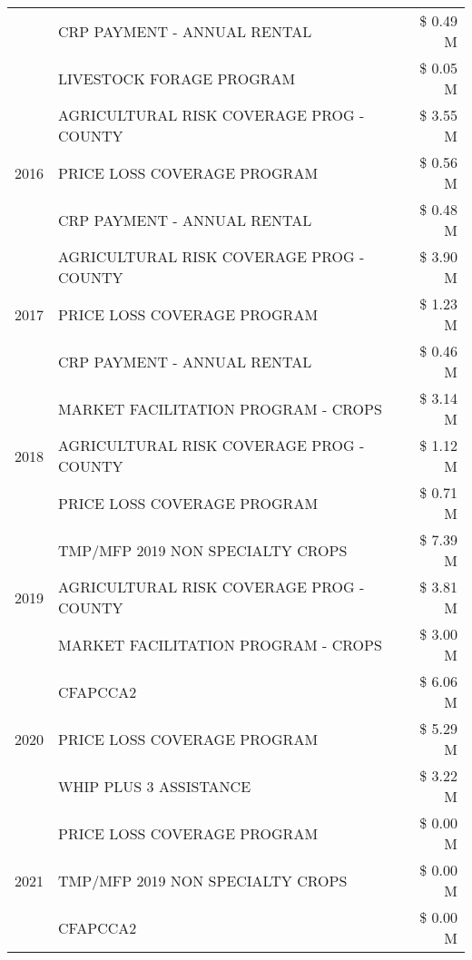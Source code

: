 \begin{tabular}{llr}
 & CRP PAYMENT - ANNUAL RENTAL & \$ 0.49 M \\
 & LIVESTOCK FORAGE PROGRAM & \$ 0.05 M \\
\cline{1-3}
\multirow[t]{3}{*}{2016} & AGRICULTURAL RISK COVERAGE PROG - COUNTY & \$ 3.55 M \\
 & PRICE LOSS COVERAGE PROGRAM & \$ 0.56 M \\
 & CRP PAYMENT - ANNUAL RENTAL & \$ 0.48 M \\
\cline{1-3}
\multirow[t]{3}{*}{2017} & AGRICULTURAL RISK COVERAGE PROG - COUNTY & \$ 3.90 M \\
 & PRICE LOSS COVERAGE PROGRAM & \$ 1.23 M \\
 & CRP PAYMENT - ANNUAL RENTAL & \$ 0.46 M \\
\cline{1-3}
\multirow[t]{3}{*}{2018} & MARKET FACILITATION PROGRAM - CROPS & \$ 3.14 M \\
 & AGRICULTURAL RISK COVERAGE PROG - COUNTY & \$ 1.12 M \\
 & PRICE LOSS COVERAGE PROGRAM & \$ 0.71 M \\
\cline{1-3}
\multirow[t]{3}{*}{2019} & TMP/MFP 2019 NON SPECIALTY CROPS & \$ 7.39 M \\
 & AGRICULTURAL RISK COVERAGE PROG - COUNTY & \$ 3.81 M \\
 & MARKET FACILITATION PROGRAM - CROPS & \$ 3.00 M \\
\cline{1-3}
\multirow[t]{3}{*}{2020} & CFAPCCA2 & \$ 6.06 M \\
 & PRICE LOSS COVERAGE PROGRAM & \$ 5.29 M \\
 & WHIP PLUS 3 ASSISTANCE & \$ 3.22 M \\
\cline{1-3}
\multirow[t]{3}{*}{2021} & PRICE LOSS COVERAGE PROGRAM & \$ 0.00 M \\
 & TMP/MFP 2019 NON SPECIALTY CROPS & \$ 0.00 M \\
 & CFAPCCA2 & \$ 0.00 M \\
\cline{1-3}
\bottomrule
\end{tabular}
